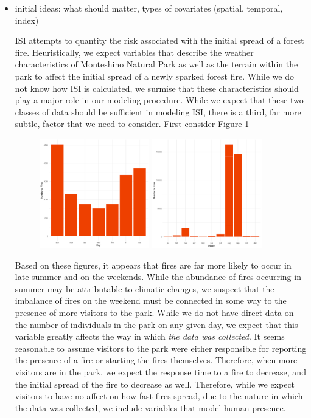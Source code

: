 \documentclass{article}
\begin{document}
\begin{itemize}

\item initial ideas: what should matter, types of covariates (spatial, temporal, index)

ISI attempts to quantity the risk associated with the initial spread of a forest fire. Heuristically, we expect variables that describe the weather characteristics of Monteshino Natural Park as well as the terrain within the park to affect the initial spread of a newly sparked forest fire. While we do not know how ISI is calculated, we surmise that these characteristics should play a major role in our modeling procedure. While we expect that these two classes of data should be sufficient in modeling ISI, there is a third, far more subtle, factor that we need to consider. First consider Figure \ref{fig:human_factor}
\begin{figure}[h!]
\centering
\includegraphics[width=0.45\textwidth]{day_bar.pdf}
\includegraphics[width=0.45\textwidth]{month_bar.pdf}
\caption{}
\label{fig:human_factor}{}
\end{figure}
Based on these figures, it appears that fires are far more likely to occur in late summer and on the weekends. While the abundance of fires occurring in summer may be attributable to climatic changes, we suspect that the imbalance of fires on the weekend must be connected in some way to the presence of more visitors to the park. While we do not have direct data on the number of individuals in the park on any given day, we expect that this variable greatly affects the way in which \textit{the data was collected}. It seems reasonable to assume visitors to the park were either responsible for reporting the presence of a fire or starting the fires themselves. Therefore, when more visitors are in the park, we expect the response time to a fire to decrease, and the initial spread of the fire to decrease as well. Therefore, while we expect visitors to have no affect on how fast fires spread, due to the nature in which the data was collected, we include variables that model human presence.   


\end{itemize}
\end{document}
